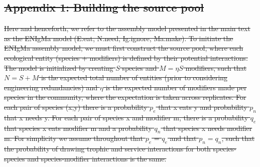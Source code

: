 \documentclass[twocolumn,preprintnumbers,amsmath,amssymb,superscriptaddress,linenumbers]{revtex4-1}
\newcommand{\rr}[1]{{\rm #1}}
\providecommand{\DIFdel}[1]{{\protect\color{red}\sout{#1}}}                      %
\begin{document}
\subsection*{\DIFdel{Appendix 1: Building the source pool}}
\DIFdel{Here and henceforth, we refer to the assembly model presented in the main text as the ENIgMa model (E:eat, N:need, Ig:ignore, Ma:make).
To initiate the ENIgMa assembly model, we must first construct the source pool, where each ecological entity (species + modifiers) is defined by their potential interactions.
The model is initialized by creating $S$ species and $M = \eta S$ modifiers, such that $N=S+M$ is the expected total number of entities (prior to considering engineering redundancies) and $\eta$ is the expected number of modifiers made per species in the community, where the expectation is taken across replicates.
For each pair of species (x,y) there is a probability $p_e$ that x eats y and probability $p_n$ that x needs y.
For each pair of species x and modifier m, there is a probability $q_e$ that species x eats modifier m and a probability $q_n$ that species x needs modifier m.
For simplicity we assume throughout that $p_e$ = $q_e$ and that $p_n = q_n$, such that the probability of drawing trophic and service interactions for both species-species and species-modifier interactions is the same.
}%
\end{document}
